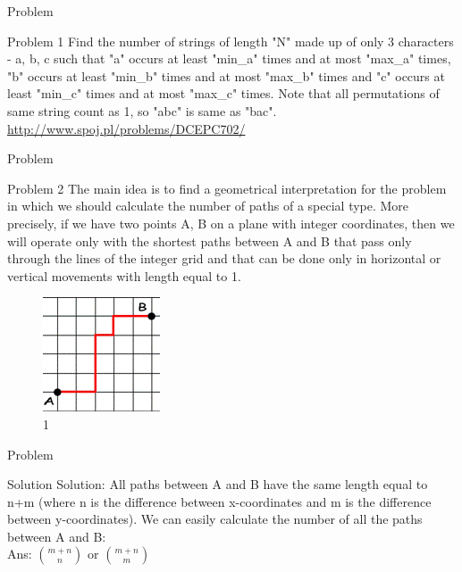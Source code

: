 \documentclass{beamer}
\begin{document}
\begin{frame}[<+->]{Problem}
  \begin{block}{Problem 1}
    Find the number of strings of length "N" made up of only 3 characters - a, b, c such that "a" occurs at least "min\_a" times and at most "max\_a" times, "b" occurs at least "min\_b" times and at most "max\_b" times and "c" occurs at least "min\_c" times and at most "max\_c" times. Note that all permutations of same string count as 1, so "abc" is same as "bac".\\
    \url{http://www.spoj.pl/problems/DCEPC702/}
  \end{block}
\end{frame}

\begin{frame}[<+->]{Problem}
  \begin{block}{Problem 2}
    The main idea is to find a geometrical interpretation for the problem in which we should calculate the number of paths of a special type. More precisely, if we have two points A, B on a plane with integer coordinates, then we will operate only with the shortest paths between A and B that pass only through the lines of the integer grid and that can be done only in horizontal or vertical movements with length equal to 1.
    \begin{figure}
	\includegraphics[scale=0.30]{figure41.png}
	\caption{1}
      \end{figure}
  \end{block}
\end{frame}

\begin{frame}[<+->]{Problem}
  \begin{block}{Solution}
    Solution: All paths between A and B have the same length equal to n+m (where n is the difference between x-coordinates and m is the difference between y-coordinates). We can easily calculate the number of all the paths between A and B:\\
    \hspace{2mm} Ans: ${m+n \choose n}$ or ${m+n \choose m}$
  \end{block}
\end{frame}
\end{document}

